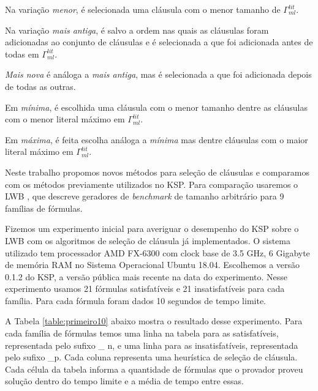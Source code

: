 Na variação \textit{menor}, é selecionada uma cláusula com o menor tamanho de $\Gamma^{lit}_{ml}$.

Na variação \textit{mais antiga}, é salvo a ordem nas quais as cláusulas foram adicionadas ao conjunto de cláusulas e é selecionada a que foi adicionada antes de todas em $\Gamma^{lit}_{ml}$.

\textit{Mais nova} é análoga a \textit{mais antiga}, mas é selecionada a que foi adicionada depois de todas as outras.

Em \textit{mínima}, é escolhida uma cláusula com o menor tamanho dentre as cláusulas com o menor literal máximo em $\Gamma^{lit}_{ml}$.

Em \textit{máxima}, é feita escolha análoga a \textit{mínima} mas dentre cláusulas com o maior literal máximo em $\Gamma^{lit}_{ml}$.

Neste trabalho propomos novos métodos para seleção de cláusulas e comparamos com os métodos previamente utilizados no KSP. Para comparação usaremos o LWB \cite{lwb}, que descreve geradores de \textit{benchmark} de tamanho arbitrário para 9 famílias de fórmulas.

Fizemos um experimento inicial para averiguar o desempenho do KSP sobre o LWB com os algoritmos de seleção de cláusula já implementados. O sistema utilizado tem processador AMD FX-6300 com clock base de 3.5 GHz, 6 Gigabyte de memória RAM no Sistema Operacional Ubuntu 18.04. Escolhemos a versão 0.1.2 do KSP, a versão pública mais recente na data do experimento. Nesse experimento usamos 21 fórmulas satisfatíveis e 21 insatisfatíveis para cada família. Para cada fórmula foram dados 10 segundos de tempo limite.

A Tabela \ref{table:primeiro10} abaixo mostra o resultado desse experimento. Para cada família de fórmulas temos uma linha na tabela para as satisfatíveis, representada pelo sufixo \_ n, e uma linha para as insatisfatíveis, representada pelo sufixo \_p. Cada coluna representa uma heurística de seleção de cláusula. Cada célula da tabela informa a quantidade de fórmulas que o provador proveu solução dentro do tempo limite e a média de tempo entre essas.

